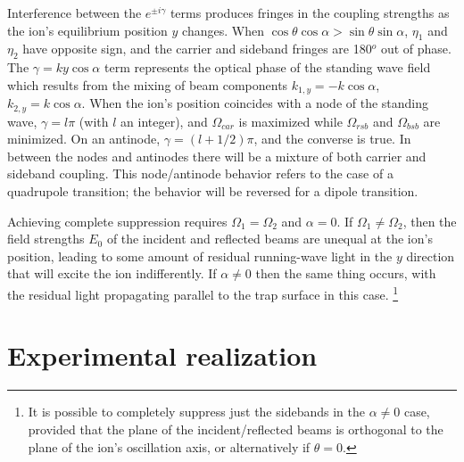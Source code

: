 Interference between the $e^{\pm i \gamma}$ terms produces fringes in the coupling strengths as the ion's equilibrium position $y$ changes. When $\cos \theta \cos \alpha > \sin \theta \sin \alpha$, $\eta_1$ and $\eta_2$ have opposite sign, and the carrier and sideband fringes are 180$^o$ out of phase. The $\gamma = k y \cos \alpha$ term represents the optical phase of the standing wave field which results from the mixing of beam components $k_{1,y} = - k \cos \alpha$, $k_{2,y} = k \cos \alpha$. When the ion's position coincides with a node of the standing wave, $\gamma = l \pi$ (with $l$ an integer), and $\Omega_{car}$ is maximized while $\Omega_{rsb}$ and $\Omega_{bsb}$ are minimized. On an antinode, $\gamma = (l + 1/2) \pi$, and the converse is true. In between the nodes and antinodes there will be a mixture of both carrier and sideband coupling. This node/antinode behavior refers to the case of a quadrupole transition; the behavior will be reversed for a dipole transition.

Achieving complete suppression requires $\Omega_1 = \Omega_2$ and $\alpha = 0$. If $\Omega_1 \neq \Omega_2$, then the field strengths $E_0$ of the incident and reflected beams are unequal at the ion's position, leading to some amount of residual running-wave light in the $y$ direction that will excite the ion indifferently. If $\alpha \neq 0$ then the same thing occurs, with the residual light propagating parallel to the trap surface in this case. \footnote{It is possible to completely suppress just the sidebands in the $\alpha \neq 0$ case, provided that the plane of the incident/reflected beams is orthogonal to the plane of the ion's oscillation axis, or alternatively if $\theta = 0$.}  


\section{Experimental realization}


